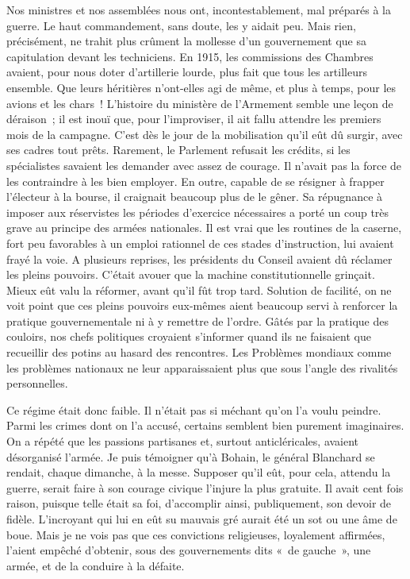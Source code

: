 \documentclass[french,twoside]{book} %
\begin{document}
  Nos ministres et nos assemblées nous ont, incontestablement, mal préparés à la guerre. Le haut commandement, sans doute, les y aidait peu. Mais rien, précisément, ne trahit plus crûment la mollesse d’un gouvernement que sa capitulation devant les techniciens. En 1915, les commissions des Chambres avaient, pour nous doter d’artillerie lourde, plus fait que tous les artilleurs ensemble. Que leurs héritières n’ont-elles agi de même, et plus à temps, pour les avions et les chars ! L’histoire du ministère de l’Armement semble une leçon de déraison ; il est inouï que, pour l’improviser, il ait fallu attendre les premiers mois de la campagne. C’est dès le jour de la mobilisation qu’il eût dû surgir, avec ses cadres tout prêts. Rarement, le Parlement refusait les crédits, si les spécialistes savaient les demander avec assez de courage. Il n’avait pas la force de les contraindre à les bien employer. En outre, capable de se résigner à frapper l’électeur à la bourse, il craignait beaucoup plus de le gêner. Sa répugnance à imposer aux réservistes les périodes d’exercice nécessaires a porté un coup très grave au principe des armées nationales. Il est vrai que les routines de la caserne, fort peu favorables à un emploi rationnel de ces stades d’instruction, lui avaient frayé la voie. A plusieurs reprises, les présidents du Conseil avaient dû réclamer les pleins pouvoirs. C’était avouer que la machine constitutionnelle grinçait. Mieux eût valu la réformer, avant qu’il fût trop tard. Solution de facilité, on ne voit point que ces pleins pouvoirs eux-mêmes aient beaucoup servi à renforcer la pratique gouvernementale ni à y remettre de l’ordre. Gâtés par la pratique des couloirs, nos chefs politiques croyaient s’informer quand ils ne faisaient que recueillir des potins au hasard des rencontres. Les Problèmes mondiaux comme les problèmes nationaux ne leur apparaissaient plus que sous l’angle des rivalités personnelles.\par
Ce régime était donc faible. Il n’était pas si   méchant qu’on l’a voulu peindre. Parmi les crimes dont on l’a accusé, certains semblent bien purement imaginaires. On a répété que les passions partisanes et, surtout anticléricales, avaient désorganisé l’armée. Je puis témoigner qu’à Bohain, le général Blanchard se rendait, chaque dimanche, à la messe. Supposer qu’il eût, pour cela, attendu la guerre, serait faire à son courage civique l’injure la plus gratuite. Il avait cent fois raison, puisque telle était sa foi, d’accomplir ainsi, publiquement, son devoir de fidèle. L’incroyant qui lui en eût su mauvais gré aurait été un sot ou une âme de boue. Mais je ne vois pas que ces convictions religieuses, loyalement affirmées, l’aient empêché d’obtenir, sous des gouvernements dits « de gauche », une armée, et de la conduire à la défaite.\par
\end{document}
